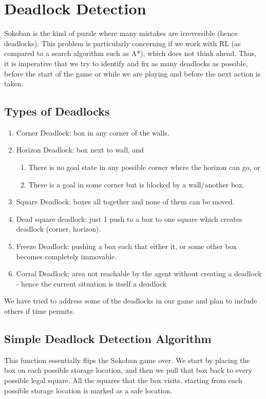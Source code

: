 \documentclass{article}
\begin{document}
\section{Deadlock Detection}

Sokoban is the kind of puzzle where many mistakes are irreversible (hence deadlocks). This problem is particularly concerning if we work with RL (as compared to a search algorithm such as A*), which does not think ahead. Thus, it is imperative that we try to identify and fix as many deadlocks as possible, before the start of the game or while we are playing and before the next action is taken.  

\subsection{Types of Deadlocks}
\begin{enumerate}
    \item Corner Deadlock: box in any corner of the walls.
    \item Horizon Deadlock: box next to wall, and 
    \begin{enumerate}[label=\alph*)]
        \item There is no goal state in any possible corner where the horizon can go, or
        \item There is a goal in some corner but is blocked by a wall/another box.
    \end{enumerate}
    \item Square Deadlock: boxes all together and none of them can be moved.
    \item Dead square deadlock: just 1 push to a box to one square which creates deadlock (corner, horizon).
    \item Freeze Deadlock: pushing a box such that either it, or some other box becomes completely immovable.
    \item Corral Deadlock: area not reachable by the agent without creating a deadlock - hence the current situation is itself a deadlock
\end{enumerate}

We have tried to address some of the deadlocks in our game and plan to include others if time permits. 

\subsection{Simple Deadlock Detection Algorithm}
This function essentially flips the Sokoban game over. We start by placing the box on each possible storage location, and then we pull that box back to every possible legal square. All the squares that the box visits, starting from each possible storage location is marked as a safe location.
\end{document}
